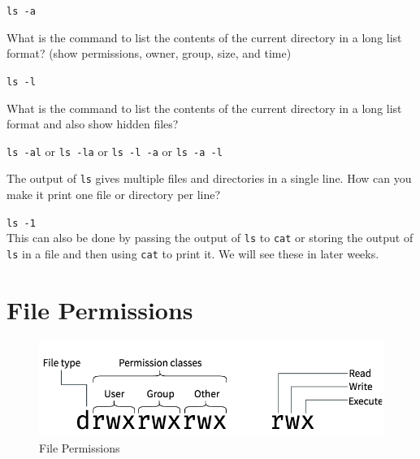 \begin{ans}
\texttt{ls -a}
\end{ans}

\begin{qs}
  What is the command to list the contents of the current directory
  in a long list format? (show permissions, owner, group, size, and time)
\end{qs}

\begin{ans}
\texttt{ls -l}
\end{ans}

\begin{qs}
  What is the command to list the contents of the current directory
  in a long list format and also show hidden files?
\end{qs}

\begin{ans}
\texttt{ls -al} or \texttt{ls -la} or \texttt{ls -l -a} or \texttt{ls -a -l}
\end{ans}

\begin{qs}
  The output of \texttt{ls} gives multiple files and directories in a single
  line. How can you make it print one file or directory per line?
\end{qs}

\begin{ans}
  \texttt{ls -1}\\
  This can also be done by passing the output of \texttt{ls} to \texttt{cat}
  or storing the output of \texttt{ls} in a file and then using \texttt{cat}
  to print it. We will see these in later weeks.
\end{ans}

\vfill
\pagebreak
\section{File Permissions}

\begin{figure}[hb]
  \includegraphics{images/png/perms.png}
  \caption[File Permissions]{File Permissions}
\end{figure}

